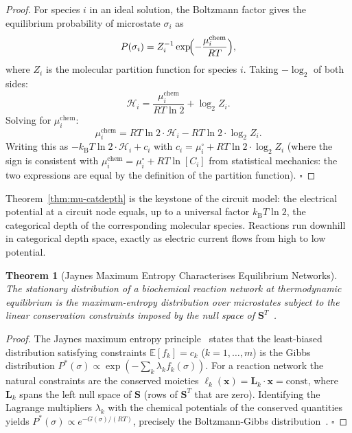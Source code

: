 \documentclass[twocolumn,10pt,a4paper]{article}
\newcommand{\kB}{k_{\mathrm{B}}}
\newcommand{\Hcat}{\mathcal{H}}
\newtheorem{theorem}{Theorem}[section]
\begin{document}
\begin{proof}
For species $i$ in an ideal solution, the Boltzmann factor gives the
equilibrium probability of microstate $\sigma_i$
as~\cite{NichollsFerguson2002,Gibbs1875}
\[
  P(\sigma_i) = Z_i^{-1}\exp\!\Bigl(-\frac{\mu_i^{\mathrm{chem}}}{RT}\Bigr),
\]
where $Z_i$ is the molecular partition function for species $i$.  Taking
$-\log_2$ of both sides:
\[
  \Hcat_i = \frac{\mu_i^{\mathrm{chem}}}{RT\ln 2} + \log_2 Z_i.
\]
Solving for $\mu_i^{\mathrm{chem}}$:
\[
  \mu_i^{\mathrm{chem}} = RT\ln 2\cdot\Hcat_i - RT\ln 2\cdot\log_2 Z_i.
\]
Writing this as $-\kB T\ln 2\cdot\Hcat_i + c_i$ with
$c_i = \mu_i^\circ + RT\ln 2\cdot\log_2 Z_i$ (where the sign is consistent
with $\mu_i^{\mathrm{chem}} = \mu_i^\circ + RT\ln[C_i]$ from statistical
mechanics: the two expressions are equal by the definition of the partition
function).  $\square$
\end{proof}

Theorem~\ref{thm:mu-catdepth} is the keystone of the circuit model: the
electrical potential at a circuit node equals, up to a universal factor
$\kB T\ln 2$, the categorical depth of the corresponding molecular species.
Reactions run downhill in categorical depth space, exactly as electric current
flows from high to low potential.

\begin{theorem}[Jaynes Maximum Entropy Characterises Equilibrium Networks]
\label{thm:jaynes}
The stationary distribution of a biochemical reaction network at thermodynamic
equilibrium is the maximum-entropy distribution over microstates subject to
the linear conservation constraints imposed by the null space of
$\mathbf{S}^T$~\cite{Jaynes1957}.
\end{theorem}

\begin{proof}
The Jaynes maximum entropy principle~\cite{Jaynes1957,CoverThomas2006} states
that the least-biased distribution satisfying constraints
$\mathbb{E}[f_k]=c_k$ ($k=1,\ldots,m$) is the Gibbs distribution
$P^*(\sigma)\propto\exp(-\sum_k\lambda_k f_k(\sigma))$.  For a reaction
network the natural constraints are the conserved moieties
$\ell_k(\mathbf{x})=\mathbf{L}_k\cdot\mathbf{x}=\mathrm{const}$, where
$\mathbf{L}_k$ spans the left null space of $\mathbf{S}$ (rows of $\mathbf{S}^T$
that are zero).  Identifying the Lagrange multipliers $\lambda_k$ with the
chemical potentials of the conserved quantities yields
$P^*(\sigma)\propto e^{-G(\sigma)/(RT)}$, precisely the Boltzmann-Gibbs
distribution~\cite{NichollsFerguson2002}.  $\square$
\end{proof}
\end{document}
